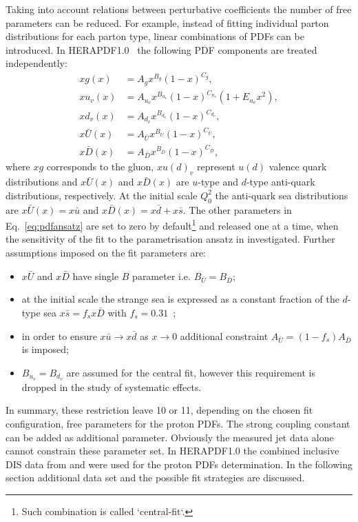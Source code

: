 Taking into account relations between perturbative coefficients the number of free parameters can be reduced. For example, instead of fitting individual parton distributions for each parton type, linear combinations of PDFs can be introduced.  In HERAPDF1.0~\cite{Aaron:2009aa} the following PDF components are treated independently:
\begin{align}
 xg\left(x\right) &= A_gx^{B_g}\left(1-x\right)^{C_g},\\
 xu_v\left(x\right) &= A_{u_v}x^{B_{u_v}}\left(1-x\right)^{C_{u_v}}\left(1+E_{u_v}x^2\right),\\
 xd_v\left(x\right) &= A_{d_v}x^{B_{d_v}}\left(1-x\right)^{C_{d_v}},\\
 x\bar{U}\left(x\right) &= A_{\bar{U}}x^{B_{\bar{U}}}\left(1-x\right)^{C_{\bar{U}}},\\
 x\bar{D}\left(x\right) &= A_{\bar{D}}x^{B_{\bar{D}}}\left(1-x\right)^{C_{\bar{D}}},
\end{align}
where $xg$ corresponds to the gluon, $xu\left(d\right)_v$ represent $u\left(d\right)$ valence quark distributions and $x\bar{U}\left(x\right)$ and $x\bar{D}\left(x\right)$ are $u$-type and $d$-type anti-quark distributions, respectively. At the initial scale $Q^2_0$ the anti-quark sea distributions are $x\bar{U}\left(x\right)=x\bar u$ and $x\bar{D}\left(x\right)=x\bar d+x\bar s$. The other parameters in Eq.~\eqref{eq:pdfansatz} are set to zero by default\footnote{Such combination is called `central-fit`.} and released one at a time, when the sensitivity of the fit to the parametrisation ansatz in investigated. Further assumptions imposed on the fit parameters are:
\begin{itemize}
 \item $x\bar{U}$ and $x\bar{D}$ have single $B$ parameter i.e. $B_{\bar{U}}=B_{\bar{D}}$;
 \item at the initial scale the strange sea is expressed as a constant fraction of the $d$-type sea $x\bar s=f_s x \bar D$ with $f_s=0.31$~\cite{Martin:2009iq,Nadolsky:2008zw};
 \item in order to ensure $x\bar u \rightarrow x\bar d$ as $x\rightarrow 0$ additional constraint $A_{\bar U}=\left(1-f_s\right)A_{\bar D}$ is imposed;
 \item $B_{u_v}=B_{d_v}$ are assumed for the central fit, however this requirement is dropped in the study of systematic effects.
\end{itemize}
In summary, these restriction leave 10 or 11, depending on the chosen fit configuration, free parameters for the proton PDFs. The strong coupling constant \asz can be added as additional parameter. Obviously the measured jet data alone cannot constrain these parameter set. In HERAPDF1.0 the combined inclusive DIS data from \hone and \zeus were used for the proton PDFs determination. In the following section additional data set and the possible fit strategies are discussed.
